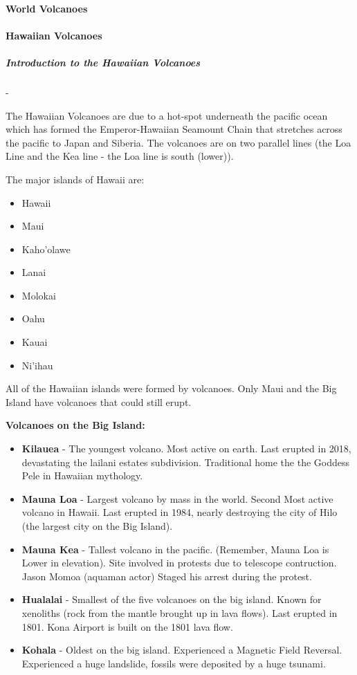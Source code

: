 \documentclass{book}
\begin{document}
			\paragraph{World Volcanoes}
			\newpage
			\paragraph{Hawaiian Volcanoes}
				\subparagraph{Introduction to the Hawaiian Volcanoes} - 
				
				The Hawaiian Volcanoes are due to a hot-spot underneath the pacific ocean which has formed the Emperor-Hawaiian Seamount Chain that stretches across the pacific to Japan and Siberia.  The volcanoes are on two parallel lines (the Loa Line and the Kea line - the Loa line is south (lower)).   
				
				The major islands of Hawaii are: 
				\begin{itemize}
					\item Hawaii
					\item Maui
					\item Kaho'olawe
					\item Lanai
					\item Molokai
					\item Oahu
					\item Kauai
					\item Ni'ihau
				\end{itemize}

				All of the Hawaiian islands were formed by volcanoes.  Only Maui and the Big Island have volcanoes that could still erupt.  
				
				\vspace{0.1in}
			
				\textbf{Volcanoes on the Big Island:}
				\begin{itemize}
					\item \textbf{Kilauea} - The youngest volcano.  Most active on earth.  Last erupted in 2018, devastating the lailani estates subdivision.  Traditional home the the Goddess Pele in Hawaiian mythology.  
					\item \textbf{Mauna Loa} - Largest volcano by mass in the world.  Second Most active volcano in Hawaii.  Last erupted in 1984, nearly destroying the city of Hilo (the largest city on the Big Island).  
					\item \textbf{Mauna Kea} - Tallest volcano in the pacific. (Remember, Mauna Loa is Lower in elevation).  Site involved in protests due to telescope contruction.  Jason Momoa (aquaman actor) Staged his arrest during the protest. 
					\item \textbf{Hualalai} - Smallest of the five volcanoes on the big island.  Known for xenoliths (rock from the mantle brought up in lava flows).  Last erupted in 1801.  Kona Airport is built on the 1801 lava flow.  
					\item \textbf{Kohala} - Oldest on the big island.  Experienced a Magnetic Field Reversal.  Experienced a huge landslide, fossils were deposited by a huge tsunami.  
				\end{itemize}
				
\end{document}
